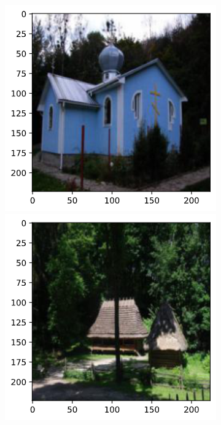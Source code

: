 \documentclass[10pt,twocolumn,letterpaper]{article}
\begin{document}
\begin{figure}[]
    \centering
    \begin{minipage}[t]{0.23\textwidth}
        \includegraphics[width=\textwidth]{COMP4471_Final_Report/img/177870_01.png}
    \end{minipage}
    \begin{minipage}[t]{0.23\textwidth}
        \includegraphics[width=\textwidth]{COMP4471_Final_Report/img/177870_02.png}

\end{minipage}
\end{figure}
\end{document}
